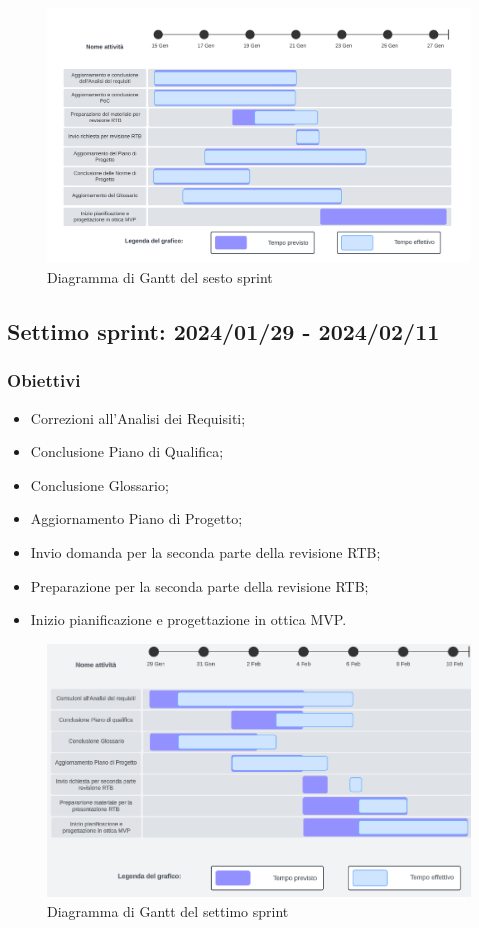 \begin{figure}[h!]
    \centering  
    \includegraphics[width=\textwidth]{Roadmap6sprint.png}
    \caption{Diagramma di Gantt del sesto sprint}
    \label{fig:roadmap6s}
\end{figure}
\newpage

\subsection{Settimo sprint: 2024/01/29 - 2024/02/11}
\subsubsection{Obiettivi}
\begin{itemize}[itemsep=-2pt]
    \item Correzioni all'Analisi dei Requisiti;
    \item Conclusione Piano di Qualifica;
    \item Conclusione Glossario;
    \item Aggiornamento Piano di Progetto;
    \item Invio domanda per la seconda parte della revisione RTB;
    \item Preparazione per la seconda parte della revisione RTB;
    \item Inizio pianificazione e progettazione in ottica MVP.
\end{itemize}

\begin{figure}[h!]
    \centering  
    \includegraphics[width=\textwidth]{Roadmap7sprint.png}
    \caption{Diagramma di Gantt del settimo sprint}
    \label{fig:roadmap7s}
\end{figure}
\newpage

